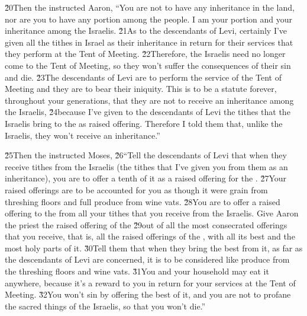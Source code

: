 \v{20}Then the  instructed Aaron, ``You are not to have any inheritance in the land, nor are you to have any portion among the people. I am your portion and your inheritance among the Israelis. \v{21}As to the descendants of Levi, certainly I've given all the tithes in Israel as their inheritance in return for their services that they perform at the Tent of Meeting. \v{22}Therefore, the Israelis need no longer come to the Tent of Meeting, so they won't suffer the consequences of their sin and die. \v{23}The descendants of Levi are to perform the service of the Tent of Meeting and they are to bear their iniquity. This is to be a statute forever, throughout your generations, that they are not to receive an inheritance among the Israelis, \v{24}because I've given to the descendants of Levi the tithes that the Israelis bring to the  as raised offering. Therefore I told them that, unlike the Israelis, they won't receive an inheritance.''

\v{25}Then the  instructed Moses, \v{26}``Tell the descendants of Levi that when they receive tithes from the Israelis (the tithes that I've given you from them as an inheritance), you are to offer a tenth of it as a raised offering for the . \v{27}Your raised offerings are to be accounted for you as though it were grain from threshing floors and full produce from wine vats. \v{28}You are to offer a raised offering to the  from all your tithes that you receive from the Israelis. Give Aaron the priest the raised offering of the  \v{29}out of all the most consecrated offerings that you receive, that is, all the raised offerings of the , with all its best and the most holy parts of it. \v{30}Tell them that when they bring the best from it, as far as the descendants of Levi are concerned, it is to be considered like produce from the threshing floors and wine vats. \v{31}You and your household may eat it anywhere, because it's a reward to you in return for your services at the Tent of Meeting. \v{32}You won't sin by offering the best of it, and you are not to profane the sacred things of the Israelis, so that you won't die.''

